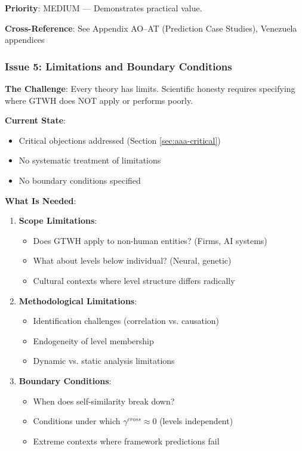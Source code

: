 \begin{tcolorbox}[colback=yellow!5!white, colframe=yellow!75!black, title=Status: One Example Only]
\textbf{Priority}: \colorbox{yellow!20}{MEDIUM} --- Demonstrates practical value.

\textbf{Cross-Reference}: See Appendix AO--AT (Prediction Case Studies), Venezuela appendices
\end{tcolorbox}

\subsubsection{Issue 5: Limitations and Boundary Conditions}

\begin{tcolorbox}[colback=yellow!5!white, colframe=yellow!75!black, title=Status: Not Addressed]
\textbf{The Challenge}: Every theory has limits. Scientific honesty requires 
specifying where GTWH does NOT apply or performs poorly.

\textbf{Current State}: 
\begin{itemize}[nosep]
\item Critical objections addressed (Section \ref{sec:aaa-critical})
\item No systematic treatment of limitations
\item No boundary conditions specified
\end{itemize}

\textbf{What Is Needed}:
\begin{enumerate}
\item \textbf{Scope Limitations}:
    \begin{itemize}[nosep]
    \item Does GTWH apply to non-human entities? (Firms, AI systems)
    \item What about levels below individual? (Neural, genetic)
    \item Cultural contexts where level structure differs radically
    \end{itemize}

\item \textbf{Methodological Limitations}:
    \begin{itemize}[nosep]
    \item Identification challenges (correlation vs. causation)
    \item Endogeneity of level membership
    \item Dynamic vs. static analysis limitations
    \end{itemize}

\item \textbf{Boundary Conditions}:
    \begin{itemize}[nosep]
    \item When does self-similarity break down?
    \item Conditions under which $\gamma^{cross} \approx 0$ (levels independent)
    \item Extreme contexts where framework predictions fail
    \end{itemize}


\end{enumerate}
\end{tcolorbox}
